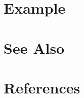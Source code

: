 \section{Example} %
\label{sec:rbaLateLateralEnergy_example}



\section{See Also} %
\label{sec:rbaLateLateralEnergy_see_also}



\section{References} %
\label{sec:rbaLateLateralEnergy_references}



